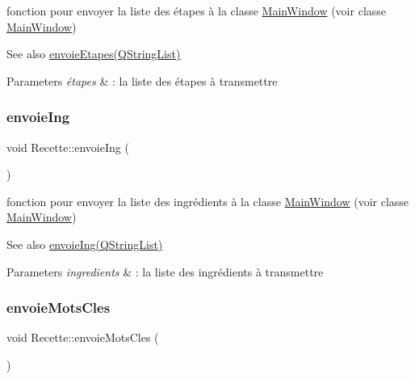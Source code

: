 fonction pour envoyer la liste des étapes à la classe \hyperlink{classMainWindow}{Main\+Window} (voir classe \hyperlink{classMainWindow}{Main\+Window}) 

\begin{DoxySeeAlso}{See also}
\hyperlink{classRecette_ab8af419707ae263fb7b273988b81bd6e}{envoie\+Etapes(\+Q\+String\+List)} 
\end{DoxySeeAlso}

\begin{DoxyParams}{Parameters}
{\em étapes} & \+: la liste des étapes à transmettre \\
\hline
\end{DoxyParams}
\mbox{\label{classRecette_a02f5f61d8c8a59b482f81da7450aa133}} 
\subsubsection{\texorpdfstring{envoie\+Ing}{envoieIng}}
{\footnotesize\ttfamily void Recette\+::envoie\+Ing (\begin{DoxyParamCaption}\item[{Q\+String\+List}]{ }\end{DoxyParamCaption})\hspace{0.3cm}{\ttfamily [signal]}}



fonction pour envoyer la liste des ingrédients à la classe \hyperlink{classMainWindow}{Main\+Window} (voir classe \hyperlink{classMainWindow}{Main\+Window}) 

\begin{DoxySeeAlso}{See also}
\hyperlink{classRecette_a02f5f61d8c8a59b482f81da7450aa133}{envoie\+Ing(\+Q\+String\+List)} 
\end{DoxySeeAlso}

\begin{DoxyParams}{Parameters}
{\em ingredients} & \+: la liste des ingrédients à transmettre \\
\hline
\end{DoxyParams}
\mbox{\label{classRecette_a06b677268e4a76357a008460bf78bf57}} 
\subsubsection{\texorpdfstring{envoie\+Mots\+Cles}{envoieMotsCles}}
{\footnotesize\ttfamily void Recette\+::envoie\+Mots\+Cles (\begin{DoxyParamCaption}\item[{Q\+String}]{ }\end{DoxyParamCaption})\hspace{0.3cm}{\ttfamily [signal]}}



